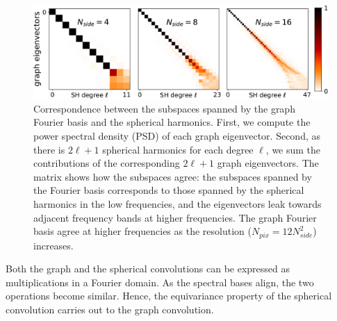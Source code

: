 \documentclass{article} %
\renewcommand{\b}[1]{{\bm{#1}}}   %
\newcommand{\1}{\b{1}}              %
\newcommand{\0}{\b{0}}              %
\begin{document}
\begin{figure}
	\centering
	\includegraphics[width=0.7\linewidth]{subspace_harmonics_eigenvectors_v2}
	\caption{Correspondence between the subspaces spanned by the graph Fourier basis and the spherical harmonics.
		First, we compute the power spectral density (PSD) of each graph eigenvector.
		Second, as there is $2\ell+1$ spherical harmonics for each degree $\ell$, we sum the contributions of the corresponding $2\ell+1$ graph eigenvectors.
		The matrix shows how the subspaces agree: the subspaces spanned by the Fourier basis corresponds to those spanned by the spherical harmonics in the low frequencies, and the eigenvectors leak towards adjacent frequency bands at higher frequencies.
	The graph Fourier basis agree at higher frequencies as the resolution ($N_{pix} = 12 N_{side}^2$) increases.}
		\label{fig:subspace_harmonics_eigenvectors}
\end{figure}

Both the graph and the spherical convolutions can be expressed as multiplications in a Fourier domain.
As the spectral bases align, the two operations become similar.
Hence, the equivariance property of the spherical convolution carries out to the graph convolution.
\end{document}
